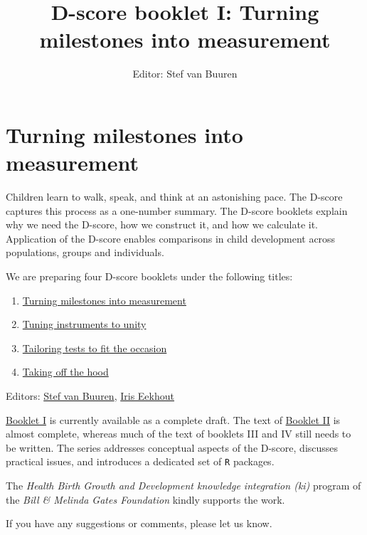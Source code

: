 \documentclass[
]{book}
\title{D-score booklet I: Turning milestones into measurement}
\author{Editor: Stef van Buuren}
\date{}
\providecommand{\tightlist}{%
  \setlength{\itemsep}{0pt}\setlength{\parskip}{0pt}}
\begin{document}
\maketitle

{
\setcounter{tocdepth}{1}
\tableofcontents
}
\hypertarget{turning-milestones-into-measurement}{%
\chapter*{Turning milestones into measurement}\label{turning-milestones-into-measurement}}

Children learn to walk, speak, and think at an astonishing pace. The D-score captures this process as a one-number summary. The D-score booklets explain why we need the D-score, how we construct it, and how we calculate it. Application of the D-score enables comparisons in child development across populations, groups and individuals.

We are preparing four D-score booklets under the following titles:

\begin{enumerate}
\def\labelenumi{\Roman{enumi}.}
\tightlist
\item
  \href{https://d-score.org/dbook1}{Turning milestones into measurement}
\item
  \href{https://d-score.org/dbook2}{Tuning instruments to unity}
\item
  \href{https://stefvanbuuren.name/dbook3}{Tailoring tests to fit the occasion}
\item
  \href{https://stefvanbuuren.name/dbook4}{Taking off the hood}
\end{enumerate}

Editors: \href{https://stefvanbuuren.name}{Stef van Buuren}, \href{https://www.iriseekhout.com}{Iris Eekhout}

\href{https://d-score.org/dbook1}{Booklet I} is currently available as a complete draft. The text of \href{https://d-score.org/dbook2}{Booklet II} is almost complete, whereas much of the text of booklets III and IV still needs to be written. The series addresses conceptual aspects of the D-score, discusses practical issues, and introduces a dedicated set of \texttt{R} packages.

The \emph{Health Birth Growth and Development knowledge integration (ki)} program of the \emph{Bill \& Melinda Gates Foundation} kindly supports the work.

If you have any suggestions or comments, please let us know.
\end{document}
